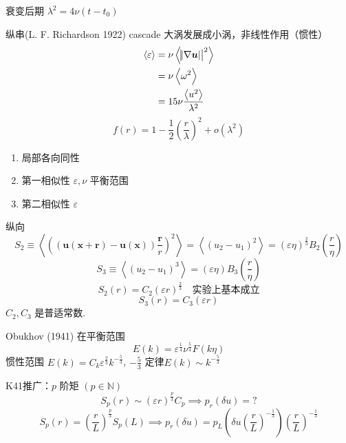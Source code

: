 \documentclass[12pt]{ctexart}
\begin{document}
衰变后期 $\lambda^2 = 4 \nu (t-t_0)$

纵串(L. F. Richardson 1922) cascade 大涡发展成小涡，非线性作用（惯性）
\begin{equation}
   \begin{aligned}
	  \left< \varepsilon \right>  & = \nu \left<  \abs{\abs{ \nabla \bm{u} }}^2 \right> \\
								  &= \nu \left< \omega^2 \right>  \\
								  &= 15\nu \frac{\left< u^2 \right> }{\lambda^2} \\
   \end{aligned}
\end{equation}
\begin{equation}
   f(r) = 1 - \frac{1}{2} \left( \frac{r}{\lambda} \right)^2 + o(\lambda^2)
\end{equation}

\begin{enumerate}
   \item 局部各向同性
   \item 第一相似性 $\varepsilon, \nu$ 平衡范围
   \item 第二相似性  $\varepsilon$
\end{enumerate}
纵向
\begin{equation}
   S_2  \equiv \left< \left( ( \bm{u} (\bm{x} + \bm{r} ) - \bm{u} (\bm{x} )) \frac{\bm{r} }{r} \right)^2  \right>  = \left< \left( u_2 - u_1 \right)^2 \right> = \left( \varepsilon \eta \right)^{\frac{2}{3}} B_2 (\frac{r}{\eta})
\end{equation}
\begin{equation}
   S_3 \equiv \left< \left( u_2 - u_1 \right)^3 \right> = (\varepsilon \eta)B_3\left( \frac{r}{\eta} \right) 
\end{equation}
\begin{equation}
   S_2 (r) = C_2 (\varepsilon r)^{\frac{2}{3}} \quad \text{实验上基本成立}
\end{equation}
\begin{equation}
   S_3 (r) = C_3 (\varepsilon r)
\end{equation}
$C_2,C_3$ 是普适常数.

Obukhov (1941) 在平衡范围
\begin{equation}
   E(k) = \varepsilon^{\frac{1}{4}} \nu^{\frac{5}{4}} F(k\eta)
\end{equation}
惯性范围 $E(k) = C_k \varepsilon^{\frac{2}{3}} k^{-\frac{5}{3}}$, $-\frac{5}{3}$ 定律$E(k) \sim k^{-\frac{5}{3}}$

K41推广：$p$ 阶矩 $( p \in \mathbb{N} ) $
\begin{equation}
   S_p (r) \sim (\varepsilon r)^{\frac{p}{3}} C_p \implies p_r (\delta u) = ?
\end{equation}
\begin{equation}
   S_p(r) = \left( \frac{r}{L} \right) ^{\frac{p}{3}} S_p(L) \implies p_r (\delta u) = p_L\left(\delta u\left( \frac{r}{L} \right)^{-\frac{1}{3}}\right) \left(\frac{r}{L} \right)^{-\frac{1}{3}}
\end{equation}
\end{document}
